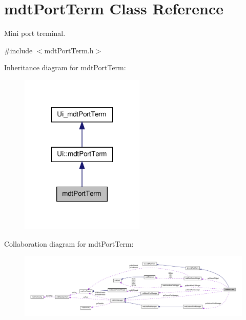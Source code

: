 \hypertarget{classmdt_port_term}{
\section{mdtPortTerm Class Reference}
\label{classmdt_port_term}
}


Mini port treminal.  




{\ttfamily \#include $<$mdtPortTerm.h$>$}



Inheritance diagram for mdtPortTerm:\nopagebreak
\begin{figure}[H]
\begin{center}
\leavevmode
\includegraphics[width=168pt]{classmdt_port_term__inherit__graph}
\end{center}
\end{figure}


Collaboration diagram for mdtPortTerm:\nopagebreak
\begin{figure}[H]
\begin{center}
\leavevmode
\includegraphics[width=400pt]{classmdt_port_term__coll__graph}
\end{center}
\end{figure}
